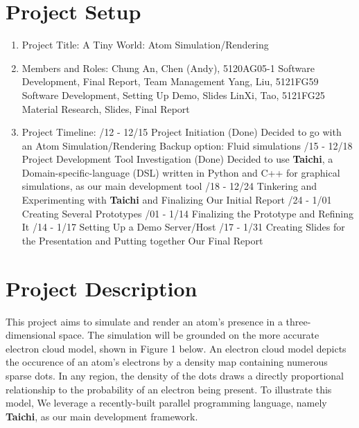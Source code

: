 \documentclass[10pt]{article}
\numberwithin{equation}{section}
\begin{document}
\section{Project Setup}
\begin{enumerate}
    \item Project Title: A Tiny World: Atom Simulation/Rendering
    \item Members and Roles:
        \subitem Chung An, Chen (Andy), 5120AG05-1
            \subsubitem Software Development, Final Report, Team Management
        \subitem Yang, Liu, 5121FG59
            \subsubitem Software Development, Setting Up Demo, Slides
        \subitem LinXi, Tao, 5121FG25
            \subsubitem Material Research, Slides, Final Report
    \item Project Timeline:
        /12 - 12/15 Project Initiation (Done)
            \subsubitem Decided to go with an Atom Simulation/Rendering
            \subsubitem Backup option: Fluid simulations
        /15 - 12/18 Project Development Tool Investigation (Done) 
            \subsubitem Decided to use \textbf{Taichi}, a Domain-specific-language (DSL) written in Python and C++ for graphical simulations, as our main development tool
        /18 - 12/24 Tinkering and Experimenting with \textbf{Taichi} and Finalizing Our Initial Report
        /24 - 1/01 Creating Several Prototypes
        /01 - 1/14 Finalizing the Prototype and Refining It
        /14 - 1/17 Setting Up a Demo Server/Host
        /17 - 1/31 Creating Slides for the Presentation and Putting together Our Final Report
\end{enumerate}
\section{Project Description}
    This project aims to simulate and render an atom's presence in a three-dimensional space. The simulation will be grounded on the more accurate electron cloud model, shown in Figure 1 below. An electron cloud model depicts the occurence of an atom's electrons by a density map containing numerous sparse dots. In any region, the density of the dots draws a directly proportional relationship to the probability of an electron being present. To illustrate this model, We leverage a recently-built parallel programming language, namely \textbf{Taichi}, as our main development framework.
\end{document}
